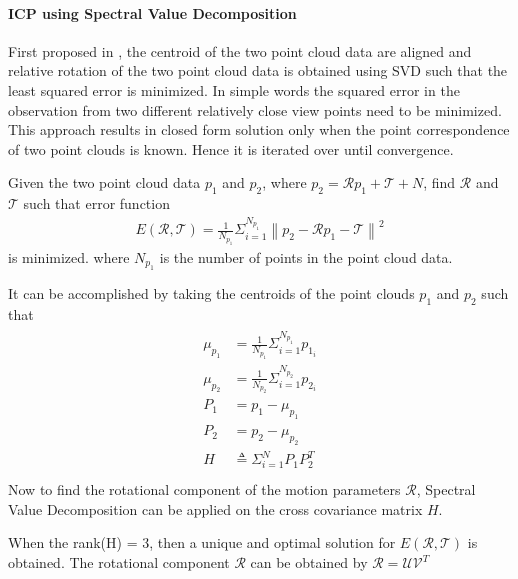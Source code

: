 \paragraph{ICP using Spectral Value Decomposition}
First proposed in \cite{KS.Arun}, the centroid of the two point cloud data are aligned and relative rotation of the two point cloud data is obtained using SVD such that the least squared error is minimized.
In simple words the squared error in the observation from two different relatively close view points need to be minimized. 
This approach results in closed form solution only when the point correspondence of two point clouds is known. Hence it is iterated over until convergence.
\par
Given the two point cloud data $p_1$ and $p_2$, where $p_2 = \mathcal{R}p_1 + \mathcal{T} + N$, find $\mathcal{R}$ and $\mathcal{T}$ such that error function
\begin{gather} \label{ICP-error}
    E(\mathcal{R}, \mathcal{T}) = \frac{1}{N_{p_1}}  \Sigma_{i=1}^{N_{p_1}}\left\lVert p_2 - \mathcal{R} p_1 -\mathcal{T} \right\rVert^2 
\end{gather}
is minimized.
where $N_{p_1}$ is the number of points in the point cloud data.

It can be accomplished by taking the centroids of the point clouds $p_1$ and $p_2$ such that
\begin{gather} \label{ICP}
    \begin{aligned}
        \mu_{p_1}&= \frac{1}{N_{p_1}} \Sigma_{i=1}^{N_{p_1}} p_{1_i}\\

        \mu_{p_2}&= \frac{1}{N_{p_2}} \Sigma_{i=1}^{N_{p_2}} p_{2_i}\\

        P_1&= p_1 - \mu_{p_1}\\
        P_2&= p_2 - \mu_{p_2}\\

        H&\triangleq  \Sigma_{i=1}^{N} P_1 P_2^T\\
    \end{aligned}
\end{gather}
Now to find the rotational component of the motion parameters $\mathcal{R}$, 
Spectral Value Decomposition can be applied on the cross covariance matrix $H$.

When the rank(H) = 3, then a unique and optimal solution for $E(\mathcal{R}, \mathcal{T})$ is obtained.
The rotational component $\mathcal{R}$ can be obtained by 
$\mathcal{R} = \mathcal{U} \mathcal{V}^T$

